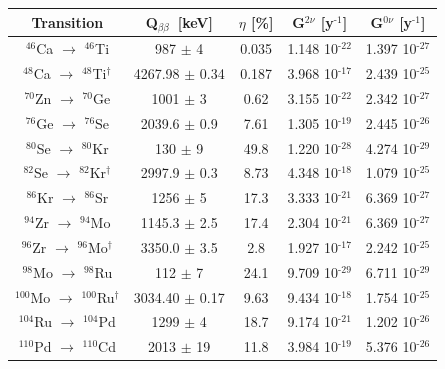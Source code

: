 \documentclass[main.tex]{subfiles}
\begin{document}
\begin{table}
\centering
\begin{tabular}{|c|c|c|c|c|}
\hline
Transition & Q$_{\beta\beta}$~[keV] & $\eta$ [\%] & G$^{\text{2}\nu}$ [y$^{\text{-1}}$] & G$^{\text{0}\nu}$ [y$^{\text{-1}}$] \\
\hline
$^{\text{46}}$Ca $\rightarrow$ $^{\text{46}}$Ti & 987      $\pm$ 4   & 0.035  & 1.148 10$^{\text{-22}}$ & 1.397 10$^{\text{-27}}$\\
\hline
$^{\text{48}}$Ca $\rightarrow$ $^{\text{48}}$Ti$^{\dagger}$ & 4267.98     $\pm$ 0.34   & 0.187  & 3.968 10$^{\text{-17}}$ & 2.439 10$^{\text{-25}}$\\ 
\hline
$^{\text{70}}$Zn $\rightarrow$ $^{\text{70}}$Ge & 1001     $\pm$ 3   & 0.62   & 3.155 10$^{\text{-22}}$ & 2.342 10$^{\text{-27}}$\\ 
\hline
$^{\text{76}}$Ge $\rightarrow$ $^{\text{76}}$Se & 2039.6   $\pm$ 0.9 & 7.61   & 1.305 10$^{\text{-19}}$ & 2.445 10$^{\text{-26}}$\\ 
\hline
$^{\text{80}}$Se $\rightarrow$ $^{\text{80}}$Kr & 130      $\pm$ 9   & 49.8   & 1.220 10$^{\text{-28}}$ & 4.274 10$^{\text{-29}}$\\ 
\hline
$^{\text{82}}$Se $\rightarrow$ $^{\text{82}}$Kr$^{\dagger}$ & 2997.9   $\pm$ 0.3   & 8.73   & 4.348 10$^{\text{-18}}$ & 1.079 10$^{\text{-25}}$\\ 
\hline
$^{\text{86}}$Kr $\rightarrow$ $^{\text{86}}$Sr & 1256     $\pm$ 5   & 17.3   & 3.333 10$^{\text{-21}}$ & 6.369 10$^{\text{-27}}$\\ 
\hline
$^{\text{94}}$Zr $\rightarrow$ $^{\text{94}}$Mo & 1145.3   $\pm$ 2.5 & 17.4   & 2.304 10$^{\text{-21}}$ & 6.369 10$^{\text{-27}}$\\ 
\hline
$^{\text{96}}$Zr $\rightarrow$ $^{\text{96}}$Mo$^{\dagger}$ & 3350.0     $\pm$ 3.5   & 2.8    & 1.927 10$^{\text{-17}}$ & 2.242 10$^{\text{-25}}$\\ 
\hline
$^{\text{98}}$Mo $\rightarrow$ $^{\text{98}}$Ru & 112      $\pm$ 7   & 24.1   & 9.709 10$^{\text{-29}}$ & 6.711 10$^{\text{-29}}$\\ 
\hline
$^{\text{100}}$Mo $\rightarrow$ $^{\text{100}}$Ru$^{\dagger}$ & 3034.40   $\pm$ 0.17   & 9.63   & 9.434 10$^{\text{-18}}$ & 1.754 10$^{\text{-25}}$\\ 
\hline
$^{\text{104}}$Ru $\rightarrow$ $^{\text{104}}$Pd & 1299   $\pm$ 4   & 18.7   & 9.174 10$^{\text{-21}}$ & 1.202 10$^{\text{-26}}$\\ 
\hline
$^{\text{110}}$Pd $\rightarrow$ $^{\text{110}}$Cd & 2013   $\pm$ 19  & 11.8   & 3.984 10$^{\text{-19}}$ & 5.376 10$^{\text{-26}}$\\ 

\end{tabular}
\end{table}
\end{document}
